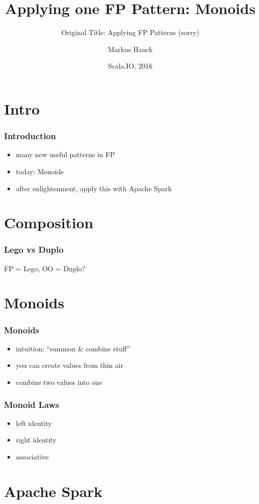 \documentclass{beamer}
\title{Applying \textbf{one} FP Pattern: Monoids}
\subtitle{Original Title: Applying FP Patterns (sorry)}
\author{Markus Hauck}
\date{Scala.IO, 2016}
\begin{document}
\frame{\titlepage}

\section{Intro}
\label{sec:intro}

\begin{frame}
  \frametitle{Introduction}
  \begin{itemize}
  \item many new useful patterns in FP
  \item today: Monoids
  \item after enlightenment, apply this with Apache Spark
  \end{itemize}
\end{frame}

\section{Composition}

\begin{frame}
  \frametitle{Lego vs Duplo}
  FP = Lego, OO = Duplo?
\end{frame}

\section{Monoids}

\begin{frame}
  \frametitle{Monoids}
  \begin{itemize}
  \item intuition: ``summon \& combine stuff''
  \item you can create values from thin air
  \item combine two values into one
  \end{itemize}
\end{frame}

\begin{frame}
  \frametitle{Monoid Laws}
  \begin{itemize}
  \item left identity
  \item right identity
  \item associative
  \end{itemize}
\end{frame}

\section{Apache Spark}
\end{document}
